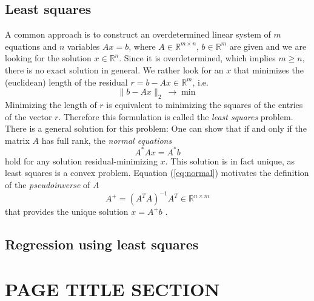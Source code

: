 \documentclass{article}
\DeclareMathOperator*{\argmin}{argmin} %
\begin{document}
\subsection{Least squares}
A common approach is to construct an overdetermined linear system of $m$ equations and $n$ variables $Ax=b$, where $A\in\mathbb{R}^{m\times n}$, $b\in\mathbb{R}^m$ are given and we are looking for the solution $x\in\mathbb{R}^n$. Since it is overdetermined, which implies $m\geq n$, there is no exact solution in general. We rather look for an $x$ that minimizes the (euclidean) length of the residual $r = b-Ax \in\mathbb{R}^m$, i.e.
\begin{equation} \label{eq:lstsq}
\lVert b-Ax \lVert_2 \: \rightarrow \min
\end{equation}
Minimizing the length of $r$ is equivalent to minimizing the squares of the entries of the vector $r$. Therefore this formulation is called the \emph{least squares} problem.\\
There is a general solution for this problem: One can show that if and only if the matrix $A$ has full rank, the \emph{normal equations}
\begin{equation} \label{eq:normal}
A^*Ax = A^*b
\end{equation}
hold for any solution residual-minimizing $x$. This solution is in fact unique, as least squares is a convex problem.
Equation (\ref{eq:normal}) motivates the definition of the \emph{pseudoinverse} of $A$
\begin{equation} \label{eq:pinv}
A^+ = (A^TA)^{-1}A^T \in\mathbb{R}^{n\times m}
\end{equation}
that provides the unique solution $x = A^+b$ \cite{numerical-la,pr-lecture}.
\subsection{Regression using least squares}


\section{PAGE TITLE SECTION}
\label{sec:pagestyle}
\end{document}
